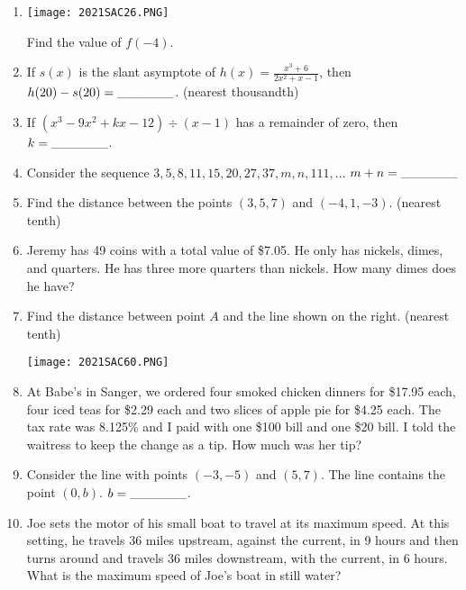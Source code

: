 \documentclass[../uilmath.tex]{subfiles}
\begin{document}
\begin{enumerate}[label=\bfseries\arabic*.]
    \item %
    \begin{center}
        \texttt{[image: 2021SAC26.PNG]}
    \end{center}

    Find the value of $f(-4)$.

    \item %
    If $s(x)$ is the slant asymptote of $h(x)=\frac{x^3+6}{2x^2+x-1}$, then $h(20)-s(20)=\_\_\_\_\_\_$. (nearest thousandth)

    \item %
    If $(x^3-9x^2+kx-12)\div(x-1)$ has a remainder of zero, then $k=\_\_\_\_\_\_$.

    \item %
    Consider the sequence $3,5,8,11,15,20,27,37,m,n,111,\dots$ $m+n=\_\_\_\_\_\_$

    \item %
    Find the distance between the points $(3,5,7)$ and $(-4,1,-3)$. (nearest tenth)

    \item %
    Jeremy has 49 coins with a total value of \$7.05. He only has nickels, dimes, and quarters. He has three more quarters than nickels. How many dimes does he have?

    \item %
    Find the distance between point $A$ and the line shown on the right. (nearest tenth)
    \begin{center}
        \texttt{[image: 2021SAC60.PNG]}
    \end{center}

    \item %
    At Babe's in Sanger, we ordered four smoked chicken dinners for \$17.95 each, four iced teas for \$2.29 each and two 
    slices of apple pie for \$4.25 each. The tax rate was 8.125\% and I paid with one \$100 bill and one \$20 bill. I told the waitress to 
    keep the change as a tip. How much was her tip?

    \item %
    Consider the line with points $(-3,-5)$ and $(5,7)$. The line contains the point $(0,b)$. $b=\_\_\_\_\_\_$.

    \item %
    Joe sets the motor of his small boat to travel at its maximum speed. At this setting, he travels 36 miles upstream, against the current, in 9 hours 
    and then turns around and travels 36 miles downstream, with the current, in 6 hours. What is the maximum speed of Joe's boat in still water?


\end{enumerate}
\end{document}

